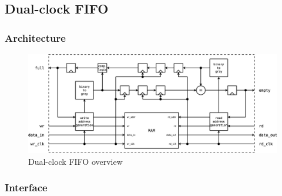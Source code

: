 \subsection{Dual-clock FIFO}


\subsubsection{Architecture}
\begin{figure}[ht]
  \includegraphics[width=0.65\textheight]{./figures/dcfifo}
  \caption{Dual-clock FIFO overview}
  \label{fig:fig_dcfifo}
\end{figure}


\subsubsection{Interface}
 
